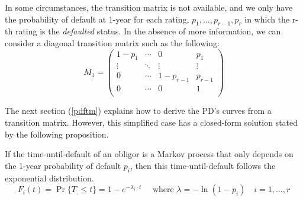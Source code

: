 \documentclass[11pt,fleqn]{book} %
\begin{document}
In some circumstances, the transition matrix is not available, and we only 
have the probability of default at 1-year for each rating, 
$p_1,\dots,p_{r-1},p_r$ in which the r-th rating is the \emph{defaulted} 
status. In the absence of more information, we can consider a diagonal 
transition matrix such as the following:
\begin{displaymath}
	M_1 = \left(
	\begin{array}{cccc}
		1-p_1  & \cdots & 0         & p_1     \\
		\vdots & \ddots & \vdots    & \vdots  \\
		0      & \cdots & 1-p_{r-1} & p_{r-1} \\
		0      & \cdots & 0         & 1       \\
	\end{array}
	\right)
\end{displaymath}

The next section (\ref{pdftm}) explains how to derive the PD's curves from a 
transition matrix. However, this simplified case has a closed-form solution 
stated by the following proposition.

\begin{proposition}
	\label{prop:pdfsv}
	If the time-until-default of an obligor is a Markov process that
	only depends on the 1-year probability of default $p_i$, then this
	time-until-default follows the exponential distribution.
	\begin{displaymath}
		F_i(t) = \Pr\{T_. \le t\} = 1 - e^{-\lambda_i \cdot t} 
		\quad \text{ where } \lambda = -\ln(1-p_i)
		\quad i=1,\dots,r
	\end{displaymath}
\end{proposition}
\end{document}
